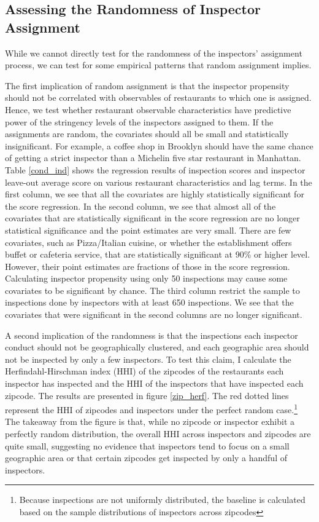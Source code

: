 \documentclass[12pt]{article}
\begin{document}
\subsection{Assessing the Randomness of Inspector Assignment}

While we cannot directly test for the randomness of the inspectors' assignment process, we can test for some empirical patterns that random assignment implies.  

The first implication of random assignment is that the inspector propensity should not be correlated with observables of restaurants to which one is assigned. Hence, we test whether restaurant observable characteristics have predictive power of the stringency levels of the inspectors assigned to them. If the assignments are random, the covariates should all be small and statistically insignificant. For example, a coffee shop in Brooklyn should have the same chance of getting a strict inspector than a Michelin five star restaurant in Manhattan. Table \ref{cond_ind} shows the regression results of inspection scores and inspector leave-out average score on various restaurant characteristics and lag terms. In the first column, we see that all the covariates are highly statistically significant for the score regression. In the second column, we see that almost all of the covariates that are statistically significant in the score regression are no longer statistical significance and the point estimates are very small. There are few covariates, such as Pizza/Italian cuisine, or whether the establishment offers buffet or cafeteria service, that are statistically significant at 90\% or higher level. However, their point estimates are fractions of those in the score regression. Calculating inspector propensity using only 50 inspections may cause some covariates to be significant by chance. The third column restrict the sample to inspections done by inspectors with at least 650 inspections. We see that the covariates that were significant in the second columns are no longer significant. 

A second implication of the randomness is that the inspections each inspector conduct should not be geographically clustered, and each geographic area should not be inspected by only a few inspectors. To test this claim, I calculate the Herfindahl-Hirschman index (HHI) of the zipcodes of the restaurants each inspector has inspected and the HHI of the inspectors that have inspected each zipcode. The results are presented in figure \ref{zip_herf}. The red dotted lines represent the HHI of zipcodes and inspectors under the perfect random case.\footnote{Because inspections are not uniformly distributed, the baseline is calculated based on the sample distributions of inspectors across zipcodes} The takeaway from the figure is that, while no zipcode or inspector exhibit a perfectly random distribution, the overall HHI across inspectors and zipcodes are quite small, suggesting no evidence that inspectors tend to focus on a small geographic area or that certain zipcodes get inspected by only a handful of inspectors. 
\end{document}
